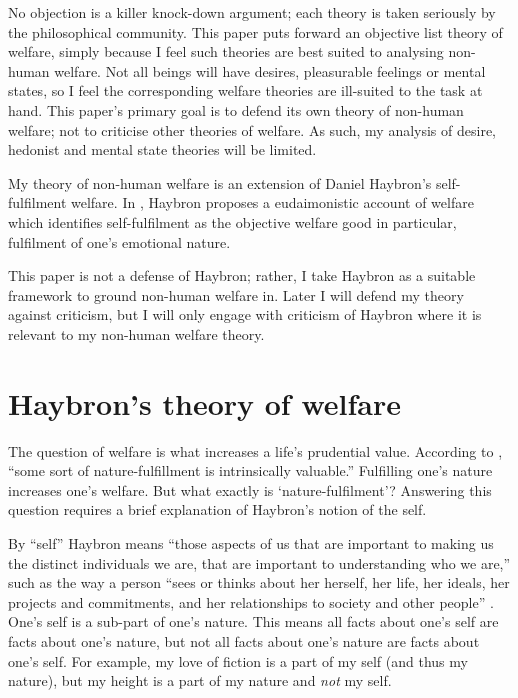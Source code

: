 \documentclass{article}
\begin{document}
No objection is a killer knock-down argument; each theory is taken seriously by the philosophical community. This paper puts forward an objective list theory of welfare, simply because I feel such theories are best suited to analysing non-human welfare. Not all beings will have desires, pleasurable feelings or mental states, so I feel the corresponding welfare theories are ill-suited to the task at hand. This paper's primary goal is to defend its own theory of non-human welfare; not to criticise other theories of welfare. As such, my analysis of desire, hedonist and mental state theories will be limited.

My theory of non-human welfare is an extension of Daniel Haybron's self-fulfilment welfare. In \citep[chapter 9]{haybron2008pursuit}, Haybron proposes a eudaimonistic account of welfare which identifies self-fulfilment as the objective welfare good \textemdash{} in particular, fulfilment of one's emotional nature. 

This paper is not a defense of Haybron; rather, I take Haybron as a suitable framework to ground non-human welfare in. Later I will defend my theory against criticism, but I will only engage with criticism of Haybron where it is relevant to my non-human welfare theory.

\section{Haybron's theory of welfare}

The question of welfare is what increases a life's prudential value. According to \citet[pg. 192]{haybron2008pursuit}, ``some sort of nature-fulfillment is intrinsically valuable.'' Fulfilling one's nature increases one's welfare. But what exactly is `nature-fulfilment'? Answering this question requires a brief explanation of Haybron's notion of the self.

By ``self'' Haybron means ``those aspects of us that are important to making us the distinct individuals we are, that are important to understanding who we are,'' such as the way a person ``sees or thinks about her herself, her life, her ideals, her projects and commitments, and her relationships to society and other people'' \citep[pg. 183, 184]{haybron2008pursuit}. One's self is a sub-part of one's nature. This means all facts about one's self are facts about one's nature, but not all facts about one's nature are facts about one's self. For example, my love of fiction is a part of my self (and thus my nature), but my height is a part of my nature and \textit{not} my self. 
\end{document}
